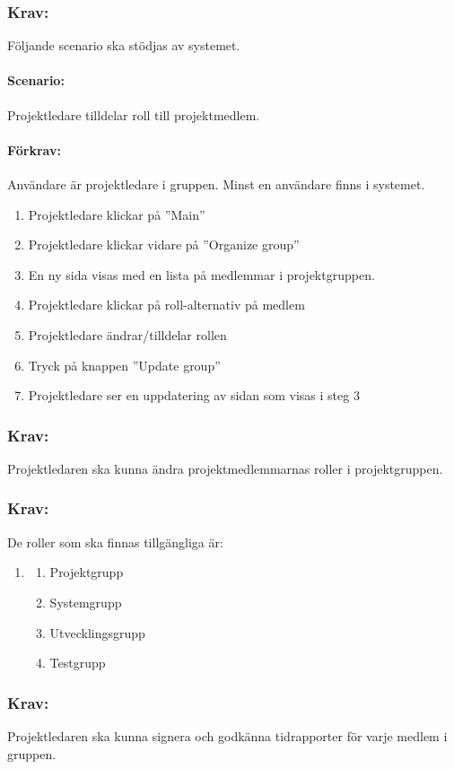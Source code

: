 \documentclass[paper=a4, fontsize=11pt,twoside]{article}
\begin{document}
\subsubsection{Krav:}
Följande scenario ska stödjas av systemet.
\paragraph{Scenario:}
Projektledare tilldelar roll till projektmedlem.
\paragraph{Förkrav:}
Användare är projektledare i gruppen. Minst en användare finns i systemet.
\begin{enumerate} 
\item Projektledare klickar på ”Main”
\item Projektledare klickar vidare på ”Organize group”
\item En ny sida visas med en lista på medlemmar i projektgruppen.
\item Projektledare klickar på roll-alternativ på medlem
\item Projektledare ändrar/tilldelar rollen
\item Tryck på knappen ”Update group”
\item Projektledare ser en uppdatering av sidan som visas i steg 3
\end{enumerate}

\subsubsection{Krav:}
Projektledaren ska kunna ändra projektmedlemmarnas roller i projektgruppen.

\subsubsection{Krav:}
De roller som ska finnas tillgängliga är:
\begin{enumerate}
\item[]
\begin{enumerate}
\item Projektgrupp
\item Systemgrupp
\item Utvecklingsgrupp
\item Testgrupp
\end{enumerate}
\end{enumerate}

\subsubsection{Krav:}
Projektledaren ska kunna signera och godkänna tidrapporter för varje medlem i gruppen.
\end{document}

